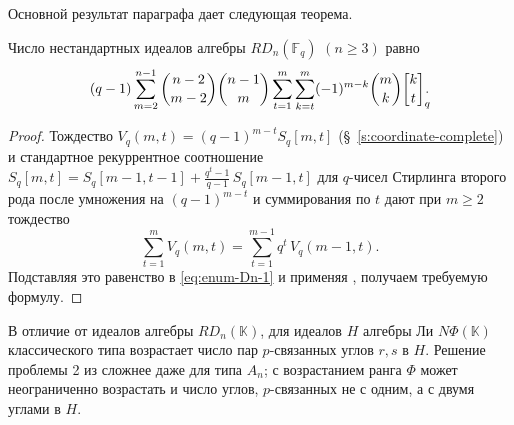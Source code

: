 \documentclass[a4paper,14pt,oneside,openany]{memoir}
\begin{document}
Основной результат параграфа дает следующая теорема.

\begin{theorem}\label{th:Enum-Dn}
    Число нестандартных идеалов алгебры $RD_n(\mathbb{F}_q)$ $(n \geq 3)$ равно
    \[
        (q-1)\sum_{m=2}^{n-1}\binom{n-2}{m-2}\binom{n-1}{m}
        \sum_{t=1}^{m}\sum_{k=t}^{m}(-1)^{m-k}\binom{m}{k}
        \qbinom{k}{t}[\mathrlap].
    \]
\end{theorem}

\begin{proof}
    Тождество $V_q(m,t)=(q-1)^{m-t}S_q[m,t]$ (\S~\ref{s:coordinate-complete}) и
    стандартное рекуррентное соотношение
    $S_q[m,t]=S_q[m-1,t-1]+\frac{q^t-1}{q-1}\,S_q[m-1,t]$ для $q$-чисел Стирлинга
    второго рода после умножения на $(q-1)^{m-t}$ и суммирования по $t$ дают при
    $m\ge2$ тождество
    \[
        \sum_{t=1}^{m} V_q(m,t) = \sum_{t=1}^{m-1} q^t\,V_q(m-1,t).
    \]
    Подставляя это равенство в \eqref{eq:enum-Dn-1} и применяя
    , получаем требуемую формулу.
\end{proof}

\begin{remark}\label{remark:problem-2}
    В отличие от идеалов алгебры $RD_n(\mathbb{K})$, для идеалов $H$ алгебры Ли
    $N\Phi(\mathbb{K})$ классического типа возрастает число пар $p$-связанных углов
    $r,s$ в $H$. Решение проблемы 2 из \cite{sigsam2001} сложнее даже для типа
    $A_n$; с возрастанием ранга $\Phi$ может неограниченно возрастать и число
    углов, $p$-связанных не с одним, а с двумя углами в $H$.
\end{remark}

\FloatBarrier


\printnomenclature[3.5cm] %

\setcounter{totalchapter}{\value{chapter}} %

\setlength{\midchapskip}{20pt}
\renewcommand*{\afterchapternum}{\par\nobreak\vskip \midchapskip}
\end{document}
